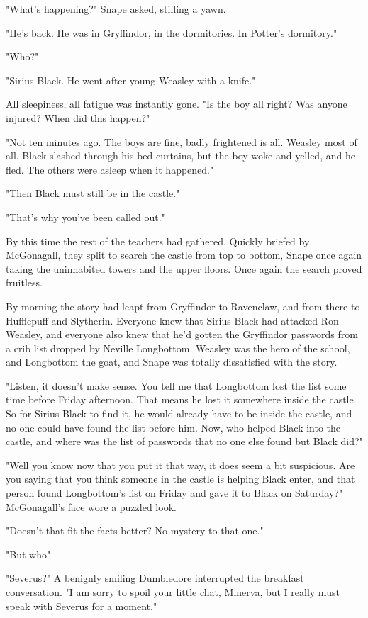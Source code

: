 "What's happening?" Snape asked, stifling a yawn.

"He's back. He was in Gryffindor, in the dormitories. In Potter's dormitory."

"Who?"

"Sirius Black. He went after young Weasley with a knife."

All sleepiness, all fatigue was instantly gone. "Is the boy all right? Was anyone injured? When did this happen?"

"Not ten minutes ago. The boys are fine, badly frightened is all. Weasley most of all. Black slashed through his bed curtains, but the boy woke and yelled, and he fled. The others were asleep when it happened."

"Then Black must still be in the castle."

"That's why you've been called out."

By this time the rest of the teachers had gathered. Quickly briefed by McGonagall, they split to search the castle from top to bottom, Snape once again taking the uninhabited towers and the upper floors. Once again the search proved fruitless.

By morning the story had leapt from Gryffindor to Ravenclaw, and from there to Hufflepuff and Slytherin. Everyone knew that Sirius Black had attacked Ron Weasley, and everyone also knew that he'd gotten the Gryffindor passwords from a crib list dropped by Neville Longbottom. Weasley was the hero of the school, and Longbottom the goat, and Snape was totally dissatisfied with the story.

"Listen, it doesn't make sense. You tell me that Longbottom lost the list some time before Friday afternoon. That means he lost it somewhere inside the castle. So for Sirius Black to find it, he would already have to be inside the castle, and no one could have found the list before him. Now, who helped Black into the castle, and where was the list of passwords that no one else found but Black did?"

"Well you know now that you put it that way, it does seem a bit suspicious. Are you saying that you think someone in the castle is helping Black enter, and that person found Longbottom's list on Friday and gave it to Black on Saturday?" McGonagall's face wore a puzzled look.

"Doesn't that fit the facts better? No mystery to that one."

"But who{\el}"

"Severus?" A benignly smiling Dumbledore interrupted the breakfast conversation. "I am sorry to spoil your little chat, Minerva, but I really must speak with Severus for a moment."

